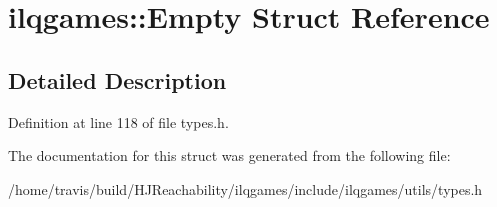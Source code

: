 \hypertarget{structilqgames_1_1_empty}{}\section{ilqgames\+:\+:Empty Struct Reference}
\label{structilqgames_1_1_empty}


\subsection{Detailed Description}


Definition at line 118 of file types.\+h.



The documentation for this struct was generated from the following file\+:\begin{DoxyCompactItemize}
\item 
/home/travis/build/\+H\+J\+Reachability/ilqgames/include/ilqgames/utils/types.\+h\end{DoxyCompactItemize}
